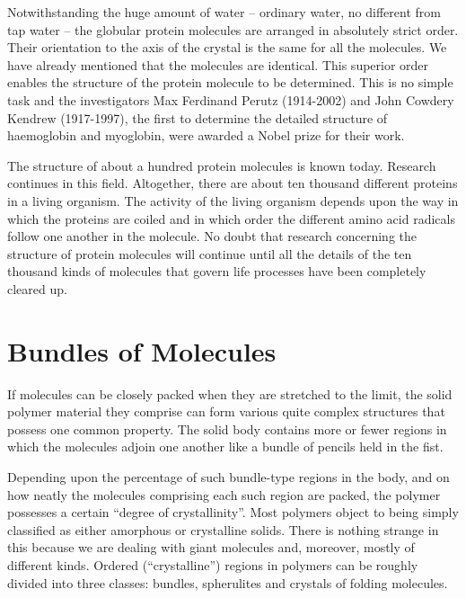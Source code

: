 Notwithstanding the huge amount of water -- ordinary water, no different from tap water -- the globular protein molecules are arranged in absolutely strict order. Their orientation to the axis of the crystal is the same for all the molecules. We have already mentioned that the mol­ecules are identical. This superior order enables the structure of the protein molecule to be determined. This is no simple task and the investigators Max Ferdinand Perutz (1914-2002) and John Cowdery Kendrew (1917-1997), the first to determine the detailed structure of haemoglobin and myoglobin, were awarded a Nobel prize for their work.

The structure of about a hundred protein molecules is known today. Research continues in this field. Alto­gether, there are about ten thousand different proteins in a living organism. The activity of the living organism depends upon the way in which the proteins are coiled and in which order the different amino acid radicals follow one another in the molecule. No doubt that research con­cerning the structure of protein molecules will continue until all the details of the ten thousand kinds of molecules that govern life processes have been completely cleared up.

\section{Bundles of Molecules}

If molecules can be closely packed when they are stretched to the limit, the solid polymer material they comprise can form various quite complex structures that pos­sess one common property. The solid body contains more or fewer regions in which the molecules adjoin one ano­ther like a bundle of pencils held in the fist.

Depending upon the percentage of such bundle-type regions in the body, and on how neatly the molecules com­prising each such region are packed, the polymer pos­sesses a certain ``degree of crystallinity''. Most polymers object to being simply classified as either amorphous or crystalline solids. There is nothing strange in this because we are dealing with giant molecules and, moreover, mostly of different kinds. Ordered (``crystalline'') regions in polymers can be roughly divided into three classes: bundles, spherulites and crystals of folding molecules.

